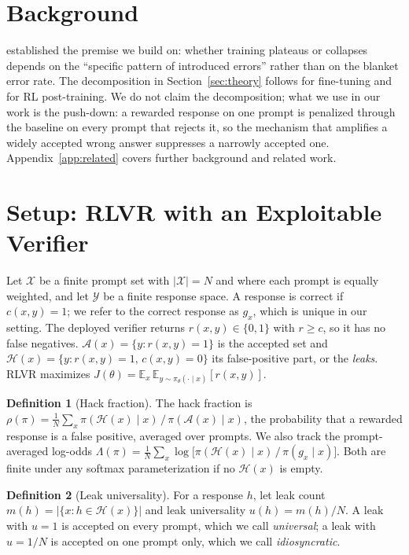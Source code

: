 \documentclass{article}
\theoremstyle{definition}
\newtheorem{definition}{Definition}
\newcommand{\Xset}{\mathcal{X}}
\newcommand{\Yset}{\mathcal{Y}}
\newcommand{\Acc}{\mathcal{A}}
\newcommand{\Hset}{\mathcal{H}}
\newcommand{\pth}{\pi_\theta}
\begin{document}
\section{Background}

\citet{egashira2026delay} established the premise we build on: whether training plateaus or collapses depends on the ``specific pattern of introduced errors'' rather than on the blanket error rate. The decomposition in Section~\ref{sec:theory} follows \citet{ren2025dynamics} for fine-tuning and \citet{tomihari2026rldynamics} for RL post-training. We do not claim the decomposition; what we use in our work is the push-down: a rewarded response on one prompt is penalized through the baseline on every prompt that rejects it, so the mechanism that amplifies a widely accepted wrong answer suppresses a narrowly accepted one. Appendix~\ref{app:related} covers further background and related work.

\section{Setup: RLVR with an Exploitable Verifier}
\label{sec:setup}

Let $\Xset$ be a finite prompt set with $|\Xset| = N$ and where each prompt is equally weighted, and let $\Yset$ be a finite response space. A response is correct if $c(x,y)=1$; we refer to the correct response as $g_x$, which is unique in our setting. The deployed verifier returns $r(x,y)\in\{0,1\}$ with $r \geq c$, so it has no false negatives. $\Acc(x)=\{y: r(x,y)=1\}$ is the accepted set and $\Hset(x) = \{y : r(x,y)=1,\, c(x,y)=0\}$ its false-positive part, or the \emph{leaks}. RLVR maximizes $J(\theta) = \mathbb{E}_{x}\,\mathbb{E}_{y\sim\pth(\cdot\mid x)}[r(x,y)]$.

\begin{definition}[Hack fraction]
The hack fraction is $\rho(\pi) = \frac{1}{N}\sum_{x} \pi(\Hset(x)\mid x)\,/\,\pi(\Acc(x)\mid x)$, the probability that a rewarded response is a false positive, averaged over prompts. We also track the prompt-averaged log-odds $\Lambda(\pi) = \frac1N \sum_x \log \big[\pi(\Hset(x)\mid x)\,/\,\pi(g_x\mid x)\big]$. Both are finite under any softmax parameterization if no $\Hset(x)$ is empty.
\end{definition}

\begin{definition}[Leak universality]
\label{def:univ}
For a response $h$, let leak count $m(h) = |\{x : h \in \Hset(x)\}|$ and leak universality $u(h) = m(h)/N$. A leak with $u=1$ is accepted on every prompt, which we call \emph{universal}; a leak with $u = 1/N$ is accepted on one prompt only, which we call \emph{idiosyncratic}.
\end{definition}
\end{document}
